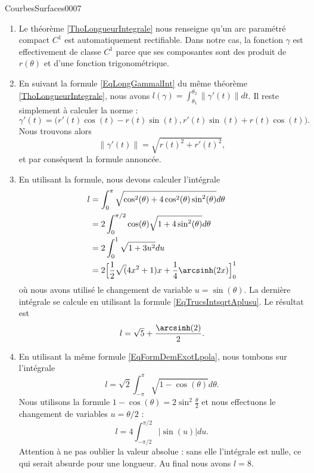 \begin{corrige}{CourbesSurfaces0007}

	\begin{enumerate}
		\item
			Le théorème \ref{ThoLongueurIntegrale} nous renseigne qu'un arc paramétré compact $C^1$ est automatiquement rectifiable. Dans notre cas, la fonction $\gamma$ est effectivement de classe $C^1$ parce que ses composantes sont des produit de $r(\theta)$ et d'une fonction trigonométrique.
		\item
			En suivant la formule \eqref{EqLongGammalInt} du même théorème \ref{ThoLongueurIntegrale}, nous avons $l(\gamma)=\int_{\theta_1}^{\theta_2}\| \gamma'(t) \|dt$. Il reste simplement à calculer la norme :
			\begin{equation}
				\gamma'(t)=\big( r'(t)\cos(t)-r(t)\sin(t),r'(t)\sin(t)+r(t)\cos(t) \big).
			\end{equation}
			Nous trouvons alors
			\begin{equation}
				\| \gamma'(t) \|=\sqrt{ r(t)^2+r'(t)^2 },
			\end{equation}
			et par conséquent la formule annoncée.
		\item
			En utilisant la formule, nous devons calculer l'intégrale
			\begin{equation}
				\begin{aligned}[]
					l&=\int_0^{\pi}\sqrt{\cos^2(\theta)+4\cos^2(\theta)\sin^2(\theta)}d\theta\\
					&=2\int_0^{\pi/2}\cos(\theta)\sqrt{1+4\sin^2(\theta)}d\theta\\
					&=2\int_0^1\sqrt{1+3u^2}du\\
                    &=2\Big[ \frac{ 1 }{2}\sqrt(4x^2 + 1)x + \frac{1}{ 4 }\arcsinh(2x)\Big]_0^1\\
				\end{aligned}
			\end{equation}
			où nous avons utilisé le changement de variable $u=\sin(\theta)$. La dernière intégrale se calcule en utilisant la formule \eqref{EqTrucsIntsqrtAplusu}. Le résultat est
			\begin{equation}
                l=\sqrt{5}+\frac{ \arcsinh(2) }{2}.
			\end{equation}
		\item
			En utilisant la même formule \eqref{EqFormDemExotLpola}, nous tombons sur l'intégrale
			\begin{equation}
				l=\sqrt{2}\int_{-\pi}^{\pi}\sqrt{1-\cos(\theta)}d\theta.
			\end{equation}
			Nous utilisons la formule $1-\cos(\theta)=2\sin^2\frac{ \theta }{2}$ et nous effectuons le changement de variables $u=\theta/2$ :
			\begin{equation}
				l=4\int_{-\pi/2}^{\pi/2}| \sin(u) |du.
			\end{equation}
			Attention à ne pas oublier la valeur absolue : sans elle l'intégrale est nulle, ce qui serait absurde pour une longueur. Au final nous avons $l=8$. 
			
	\end{enumerate}

\end{corrige}
